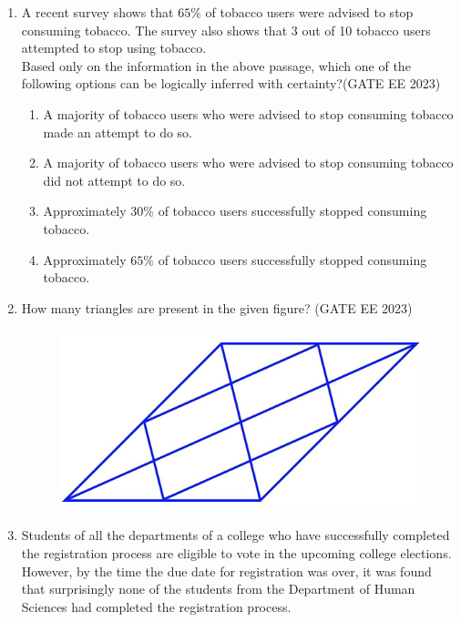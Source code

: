 \documentclass[a4paper,12pt]{exam}
\theoremstyle{remark}
\begin{document}
\begin{enumerate}
\item A recent survey shows that $65\%$ of tobacco users were advised to stop consuming tobacco. 
The survey also shows that 3 out of 10 tobacco users attempted to stop using tobacco. \\
Based only on the information in the above passage, which one of the following options can be logically inferred with certainty?\hfill{(GATE EE 2023)}
\begin{enumerate}
\item A majority of tobacco users who were advised to stop consuming tobacco made an attempt to do so.
\item A majority of tobacco users who were advised to stop consuming tobacco did not attempt to do so.
\item Approximately $30\%$ of tobacco users successfully stopped consuming tobacco.
\item Approximately $65\%$ of tobacco users successfully stopped consuming tobacco.
\end{enumerate}

\item How many triangles are present in the given figure? \hfill{(GATE EE 2023)}
\begin{figure}[H]
    \centering
    \includegraphics[width=0.3\columnwidth]{figs/Q 5.png}
    \caption{}
    \label{fig:placeholder}
\end{figure}


\begin{enumerate}
\end{enumerate}
\newpage
\item Students of all the departments of a college who have successfully completed the registration process are eligible to vote in the upcoming college elections. However, by the time the due date for registration was over, it was found that surprisingly none of the students from the Department of Human Sciences had completed the registration process. \\


\end{enumerate}
\end{document}
